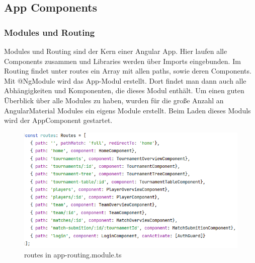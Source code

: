 \subsection{App Components}
\subsubsection{Modules und Routing}

Modules und Routing sind der Kern einer Angular App. Hier laufen alle Components zusammen und 
Libraries werden über Imports eingebunden. Im Routing findet unter routes ein Array mit allen paths, sowie deren Components. Mit @NgModule wird das App-Modul erstellt.
Dort findet man dann auch alle Abhängigkeiten und Komponenten, die dieses Modul enthält. Um einen guten Überblick über alle Modules zu haben, wurden für die große Anzahl an AngularMaterial Modules ein eigens Module erstellt.
Beim Laden dieses Moduls wird der AppComponent gestartet. 
\cite{implementation-angular-1}

\begin{figure}[H]
    \includegraphics[scale=0.5]{pics/frontend/routes.PNG}
    \caption{routes in app-routing.module.ts}
\end{figure}

